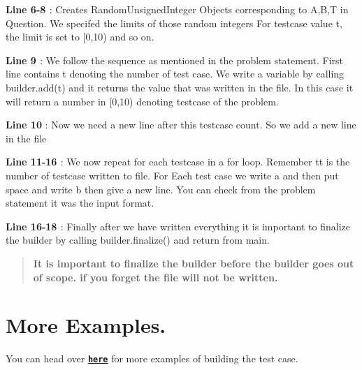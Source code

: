 {\bfseries{Line 6-\/8 }} \+: Creates Random\+Unsigned\+Integer Objects corresponding to A,B,T in Question. We specifed the limits of those random integers For testcase value t, the limit is set to \mbox{[}0,10) and so on.

{\bfseries{Line 9 }} \+: We follow the sequence as mentioned in the problem statement. First line contains t denoting the number of test case. We write a variable by calling {\ttfamily builder.\+add(t)} and it returns the value that was written in the file. In this case it will return a number in \mbox{[}0,10) denoting testcase of the problem.

{\bfseries{Line 10}} \+: Now we need a new line after this testcase count. So we add a new line in the file

{\bfseries{Line 11-\/16 }} \+: We now repeat for each testcase in a for loop. Remember {\ttfamily tt} is the number of testcase written to file. For Each test case we write \textquotesingle{}a\textquotesingle{} and then put space and write \textquotesingle{}b\textquotesingle{} then give a new line. You can check from the problem statement it was the input format.

{\bfseries{Line 16-\/18 }} \+: Finally after we have written everything it is important to finalize the builder by calling {\ttfamily builder.\+finalize()} and return from main.

\begin{quote}
{\bfseries{It is important to finalize the builder before the builder goes out of scope. if you forget the file will not be written. }} \end{quote}
\hypertarget{index_more_example}{}\section{More Examples.}\label{index_more_example}
You can head over 
\href{https://github.com/coder3101/testcaser/tree/master/examples}{\texttt{ {\bfseries{here}}}} for more examples of building the test case. 